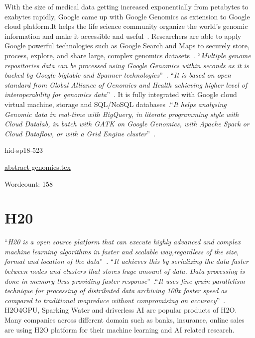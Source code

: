 With the size of medical data getting increased exponentially from 
petabytes to exabytes rapidly, Google came up with Google Genomics 
as extension to Google cloud platform.It helps the life science 
community organize the world’s genomic information and make it 
accessible and useful~\cite{hid-sp18-523-www-genomics}. 
Researchers are able to apply Google powerful technologies such as 
Google Search and Maps to securely store, process, explore, and share 
large, complex genomics datasets~\cite{hid-sp18-523-www-genomics}.
\color{blue}``\emph{Multiple genome repositories data can be processed using Google 
Genomics within seconds as it is backed by Google bigtable and 
Spanner technologies}''\color{black}~\cite{hid-sp18-523-www-genomics}. 
\color{blue}``\emph{It is based on open standard from Global Alliance of Genomics and 
Health achieving higher level of interoperability for genomics 
data}''\color{black}~\cite{hid-sp18-523-www-genomics}. It is fully integrated with 
Google cloud virtual machine, storage and SQL/NoSQL 
databases~\cite{hid-sp18-523-www-genomics}.\color{blue}``\emph{It helps analysing Genomic 
data in real-time with BigQuery, in literate programming style 
with Cloud Datalab, in batch with GATK on Google Genomics, with 
Apache Spark or Cloud Dataflow, or with a Grid Engine 
cluster}''\color{black}~\cite{hid-sp18-523-www-genomics}.


\begin{IU}

hid-sp18-523

\href{https://github.com/cloudmesh-community/hid-sp18-523/blob/master//technology/abstract-genomics.tex}{abstract-genomics.tex}

 

Wordcount: 158

\end{IU}

\section{H20}


\color{blue}``\emph{H20 is a open source platform that can execute highly advanced 
and complex machine learning algorithms in faster and scalable 
way,regardless of the size, format and location of the 
data}''\color{black}~\cite{hid-sp18-523-www-h2o}. \color{blue}``\emph{It achieves this by serializing 
the data faster between nodes and clusters that stores huge amount 
of data. Data processing is done in memory thus providing faster 
response}''\color{black}~\cite{hid-sp18-523-www-h2o}.\color{blue}``\emph{It uses fine grain parallelism 
technique for processing of distributed data archiving 100x faster 
speed as compared to traditional mapreduce without compromising 
on accuracy}''\color{black}~\cite{hid-sp18-523-www-h2o}. H2O4GPU, Sparking Water
and driverless AI are popular products of H2O. Many companies
across different domain such as banks, insurance, online sales 
are using H2O platform for their machine learning and AI related
research.







